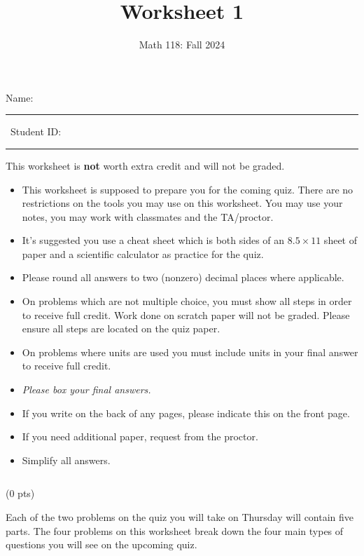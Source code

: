 \documentclass[12pt]{ximera}
\title{{\bf Worksheet 1}\vspace{-0.75cm}}
\author{Math 118: Fall 2024}
\date{}
\begin{document}
\vspace{-2cm}
\Large{ Name: \noindent\rule{5.5cm}{0.4pt} \, Student ID: \noindent\rule{5.5cm}{0.4pt} }

\normalsize

\begin{center}
    {\large This worksheet is \textbf{not} worth extra credit and will not be graded.}
\end{center}

\begin{itemize}
    \item This worksheet is supposed to prepare you for the coming quiz. There are no restrictions on the tools you may use on this worksheet. You may use your notes, you may work with classmates and the TA/proctor. 
    \item It's suggested you use a cheat sheet which is both sides of an $8.5\times 11$ sheet of paper and a scientific calculator as practice for the quiz.
    \item Please round all answers to two (nonzero) decimal places where applicable.
    \item On problems which are not multiple choice, you must show all steps in order to receive full credit. Work done on scratch paper will not be graded. Please ensure all steps are located on the quiz paper. 
    \item On problems where units are used you must include units in your final answer to receive full credit.
    \item {\it Please box your final answers.}
    \item If you write on the back of any pages, please indicate this on the front page.
    \item If you need additional paper, request from the proctor.
    \item Simplify all answers.
\end{itemize}



\newpage $\,$
\newpage


 (0 pts)

Each of the two problems on the quiz you will take on Thursday will contain five parts. The four problems on this worksheet break down the four main types of questions you will see on the upcoming quiz. 
\end{document}
